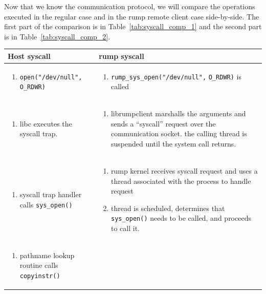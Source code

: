 Now that we know the communication protocol, we will compare the
operations executed in the regular case and in the rump remote
client case side-by-side.  The first part of the comparison
is in Table~\ref{tab:syscall_comp_1} and the second part is
in Table~\ref{tab:syscall_comp_2}.

\begin{table}
{\small
\begin{tabular}{| p{7cm} | p{7cm} |}
\hline
Host syscall & rump syscall \\
\hline
\hline

\begin{enumerate}
\item	\verb+open("/dev/null", O_RDWR)+
\end{enumerate}
&

\begin{enumerate}
\item \verb+rump_sys_open("/dev/null",+ \verb+O_RDWR)+ is called
\end{enumerate}
\\
\hline

\begin{enumerate}[start=2]
\item   libc executes the syscall trap.
\end{enumerate}
&

\begin{enumerate}[start=2]
\item	librumpclient marshalls the arguments and sends a ``syscall'' request
	over the communication socket.  the calling thread is suspended
	until the system call returns.
\end{enumerate}
\\
\hline

\begin{enumerate}[start=3]
\item   syscall trap handler calls \verb+sys_open()+
\end{enumerate}
&

\begin{enumerate}[start=3]
\item   rump kernel receives syscall request and uses
	a thread associated with the process to handle request
\item	thread is scheduled, determines that \verb+sys_open()+ needs to
	be called, and proceeds to call it.
\end{enumerate}
\\
\hline

\begin{enumerate}[start=4]
\item   pathname lookup routine calls \verb+copyinstr()+
\end{enumerate}
&


\end{tabular}}
\end{table}
